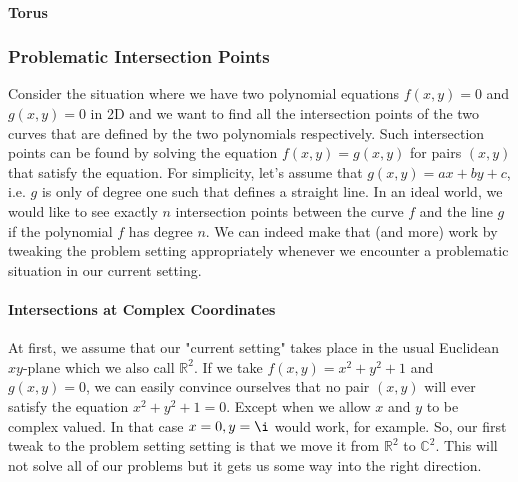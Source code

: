 \paragraph{Torus}








\subsubsection{Problematic Intersection Points}
Consider the situation where we have two polynomial equations $f(x,y) = 0$ and $g(x,y) = 0$ in 2D and we want to find all the intersection points of the two curves that are defined by the two polynomials respectively. Such intersection points can be found by solving the equation $f(x,y) = g(x,y)$ for pairs $(x,y)$ that satisfy the equation. For simplicity, let's assume that $g(x,y) = ax + by + c$, i.e. $g$ is only of degree one such that defines a straight line. In an ideal world, we would like to see exactly $n$ intersection points between the curve $f$ and the line $g$ if the polynomial $f$ has degree $n$. We can indeed make that (and more) work by tweaking the problem setting appropriately whenever we encounter a problematic situation in our current setting.

\paragraph{Intersections at Complex Coordinates}
At first, we assume that our "current setting" takes place in the usual Euclidean $xy$-plane which we also call $\mathbb{R}^2$. If we take $f(x,y) = x^2 + y^2 + 1$ and $g(x,y) = 0$, we can easily convince ourselves that no pair $(x,y)$ will ever satisfy the equation $x^2 + y^2 + 1 = 0$. Except when we allow $x$ and $y$ to be complex valued. In that case $x = 0, y = \i$ would work, for example. So, our first tweak to the problem setting setting is that we move it from $\mathbb{R}^2$ to $\mathbb{C}^2$. This will not solve all of our problems but it gets us some way into the right direction.

